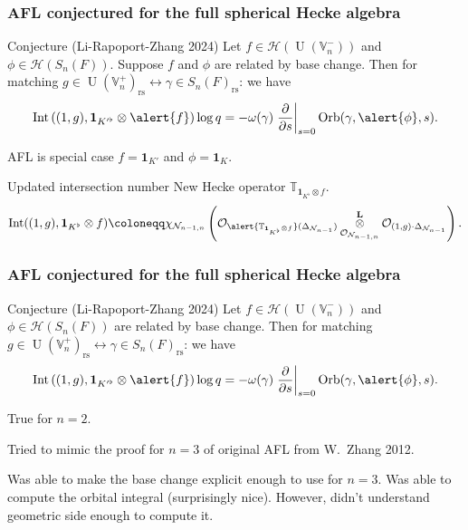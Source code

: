 \documentclass[11pt]{beamer}
\DeclareMathOperator{\Int}{Int}
\DeclareMathOperator{\Orb}{Orb}
\DeclareMathOperator{\U}{U}
\newcommand{\HH}{\mathcal{H}}
\newcommand{\VV}{\mathbb{V}}
\newcommand{\TT}{\mathbb{T}}
\newcommand{\RZ}{\mathcal{N}}
\newcommand{\Sheaf}{\mathcal O}
\newcommand{\jiao}{\mathop{\otimes}^{\mathbf{L}}} %
\newcommand{\rs}{_{\text{rs}}}
\begin{document}
\begin{frame}
  \frametitle{AFL conjectured for the full spherical Hecke algebra}
  \begin{exampleblock}{Conjecture (Li-Rapoport-Zhang 2024)}
    Let \alert{$f \in \HH(\U(\VV_n^-))$} and \alert{$\phi \in \HH(S_n(F))$}.
    Suppose \alert{$f$ and $\phi$ are related by base change}.
    Then for matching $g \in \U(\VV_n^+)\rs \longleftrightarrow \gamma \in S_n(F)\rs$:
    we have
    \[ \Int\left( (1,g), \mathbf{1}_{K'^\flat} \otimes \alert{f} \right) \log q
    = -\omega(\gamma) \left. \pdv{}{s} \right\rvert_{s=0} \Orb(\gamma, \alert{\phi}, s). \]
  \end{exampleblock}
  AFL is special case $f = \mathbf{1}_{K'}$ and $\phi = \mathbf{1}_K$.
  \begin{block}{Updated intersection number}
    New Hecke operator $\TT_{\mathbf{1}_{K^\flat} \otimes f}$.
    \[
      \Int((1,g), \mathbf{1}_{K^\flat} \otimes f)
      \coloneqq \chi_{\RZ_{n-1,n}} \left(
        \Sheaf_{\alert{\TT_{\mathbf{1}_{K^\flat} \otimes f}} (\Delta_{\RZ_{n-1}})}
        \jiao_{\Sheaf_{\RZ_{n-1,n}}} \Sheaf_{(1,g) \cdot \Delta_{\RZ_{n-1}}} \right).
    \]
  \end{block}
\end{frame}

\begin{frame}
  \frametitle{AFL conjectured for the full spherical Hecke algebra}
  \begin{exampleblock}{Conjecture (Li-Rapoport-Zhang 2024)}
    Let \alert{$f \in \HH(\U(\VV_n^-))$} and \alert{$\phi \in \HH(S_n(F))$}
    are \alert{related by base change}.
    Then for matching $g \in \U(\VV_n^+)\rs \longleftrightarrow \gamma \in S_n(F)\rs$:
    we have
    \[ \Int\left( (1,g), \mathbf{1}_{K'^\flat} \otimes \alert{f} \right) \log q
    = -\omega(\gamma) \left. \pdv{}{s} \right\rvert_{s=0} \Orb(\gamma, \alert{\phi}, s). \]
  \end{exampleblock}
  \begin{theorem}
    True for $n = 2$.
  \end{theorem}
  Tried to mimic the proof for $n = 3$ of original AFL from W.\ Zhang 2012.
  \begin{itemize}
  \ii Was able to make the base change explicit enough to use for $n = 3$.
  \ii Was able to compute the orbital integral (surprisingly nice).
  \ii However, didn't understand geometric side enough to compute it.
  \end{itemize}
\end{frame}
\end{document}
